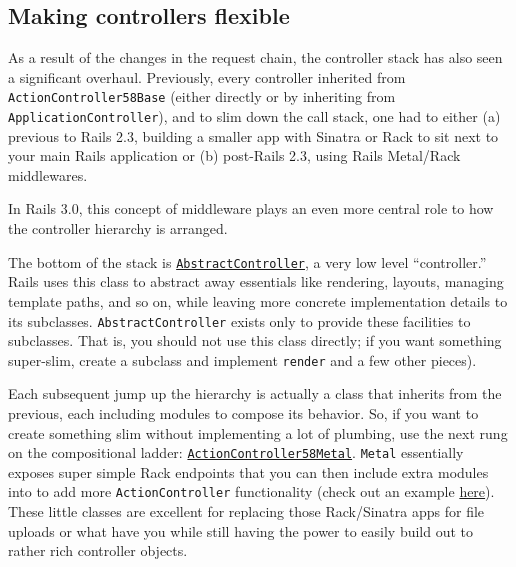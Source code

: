 \documentclass{book}
\begin{document}
\hypertarget{making_controllers_flexible}{}\subsection*{{Making controllers flexible}}\label{making_controllers_flexible}

As a result of the changes in the request chain, the controller stack has also seen a significant overhaul. Previously, every controller inherited from {\colorbox[rgb]{0.87,0.87,0.87}{\tt ActionController\char58Base}} (either directly or by inheriting from {\colorbox[rgb]{0.87,0.87,0.87}{\tt ApplicationController}}), and to slim down the call stack, one had to either (a) previous to Rails 2.3, building a smaller app with Sinatra or Rack to sit next to your main Rails application or (b) post-Rails 2.3, using Rails Metal/Rack middlewares.

In Rails 3.0, this concept of middleware plays an even more central role to how the controller hierarchy is arranged.



The bottom of the stack is \href{http://yehudakatz.com/2009/03/20/another-dispatch-abstractcontroller/}{{\colorbox[rgb]{0.87,0.87,0.87}{\tt AbstractController}}}, a very low level ``{}controller.''{} Rails uses this class to abstract away essentials like rendering, layouts, managing template paths, and so on, while leaving more concrete implementation details to its subclasses. {\colorbox[rgb]{0.87,0.87,0.87}{\tt AbstractController}} exists only to provide these facilities to subclasses. That is, you should not use this class directly; if you want something super-slim, create a subclass and implement {\colorbox[rgb]{0.87,0.87,0.87}{\tt render}} and a few other pieces).

Each subsequent jump up the hierarchy is actually a class that inherits from the previous, each including modules to compose its behavior. So, if you want to create something slim without implementing a lot of plumbing, use the next rung on the compositional ladder: \href{http://yardoc.org/docs/rails/ActionController/Metal}{{\colorbox[rgb]{0.87,0.87,0.87}{\tt ActionController\char58Metal}}}. {\colorbox[rgb]{0.87,0.87,0.87}{\tt Metal}} essentially exposes super simple Rack endpoints that you can then include extra modules into to add more {\colorbox[rgb]{0.87,0.87,0.87}{\tt ActionController}} functionality (check out an example \href{http://yehudakatz.com/2009/12/20/generic-actions-in-rails-3/}{here}). These little classes are excellent for replacing those Rack/Sinatra apps for file uploads or what have you while still having the power to easily build out to rather rich controller objects.
\end{document}
